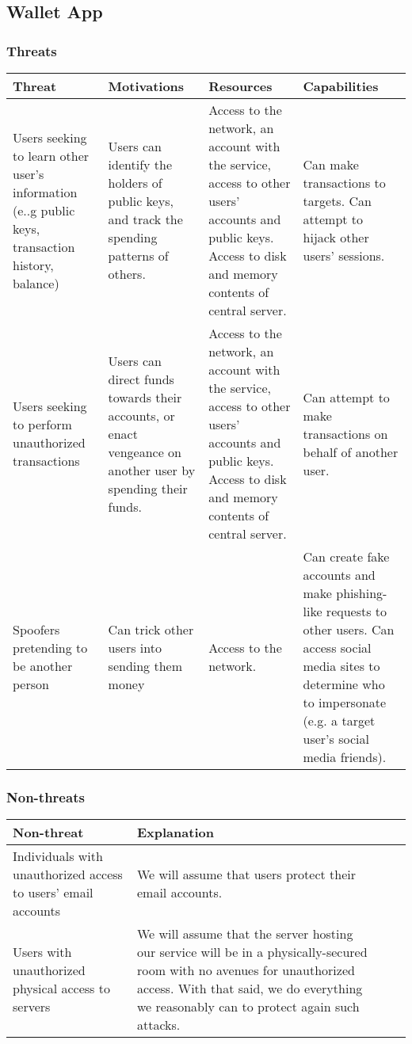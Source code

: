 \documentclass[12pt]{article}
\begin{document}
\subsection{Wallet App}

\subsubsection*{Threats}

\begin{tabulary}{\linewidth}{|L|L|L|L|}
\hline
\textbf{Threat} & \textbf{Motivations} & \textbf{Resources} & \textbf{Capabilities} \\
\hline
Users seeking to learn other user's information (e..g public keys, transaction history, balance) & Users can identify the holders of public keys, and track the spending patterns of others. & Access to the network, an account with the service, access to other users' accounts and public keys. Access to disk and memory contents of central server. & Can make transactions to targets. Can attempt to hijack other users' sessions. \\
\hline
Users seeking to perform unauthorized transactions & Users can direct funds towards their accounts, or enact vengeance on another user by spending their funds. & Access to the network, an account with the service, access to other users' accounts and public keys. Access to disk and memory contents of central server. & Can attempt to make transactions on behalf of another user. \\
\hline
Spoofers pretending to be another person & Can trick other users into sending them money & Access to the network. & Can create fake accounts and make phishing-like requests to other users. Can access social media sites to determine who to impersonate (e.g. a target user's social media friends). \\
\hline
\end{tabulary}

\subsubsection*{Non-threats}

\begin{tabulary}{\linewidth}{|L|L|L|L|}
\hline
\textbf{Non-threat} & \textbf{Explanation} \\
\hline
Individuals with unauthorized access to users' email accounts & We will assume that users protect their email accounts.
\\ \hline
Users with unauthorized physical access to servers & We will assume that the server hosting our service will be in a physically-secured room with no avenues for unauthorized access. With that said, we do everything we reasonably can to protect again such attacks.
\\ \hline
\end{tabulary}
\end{document}
